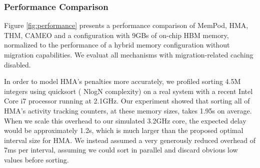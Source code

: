 \subsubsection{Performance Comparison}
\label{sub:performance}

Figure \ref{fig:performance} presents a performance comparison of MemPod, HMA, THM, CAMEO and a configuration with 9GBs of on-chip HBM memory, normalized to the performance of a hybrid memory configuration without migration capabilities. We evaluat all mechanisms with migration-related caching disabled. 

In order to model HMA's penalties more accurately, we profiled sorting 4.5M integers using quicksort ( NlogN complexity) on a real system with a recent Intel Core i7 processor running at 2.1GHz. Our experiment showed that sorting all of HMA's activity tracking counters, at these memory sizes, takes 1.95s on 
average. When we scale this overhead to our simulated 3.2GHz core, the expected delay would be approximately 1.2s, which is much larger than the proposed optimal interval size for HMA. We instead assumed a very generously reduced overhead of 7ms per interval, assuming we could sort in parallel and discard obvious low values before sorting.


